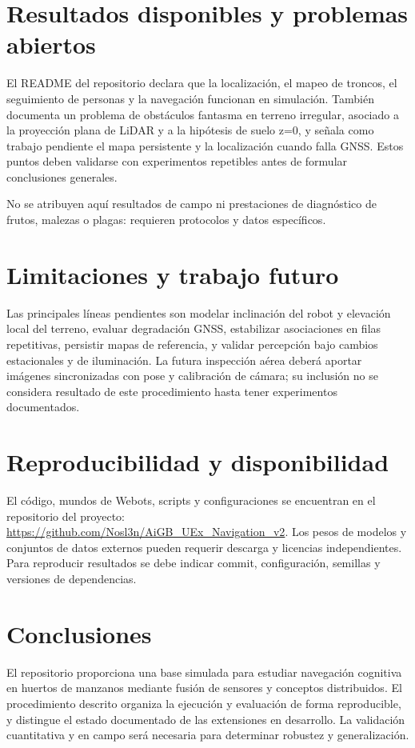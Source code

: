 \documentclass[12pt,a4paper]{article}
\begin{document}
\section{Resultados disponibles y problemas abiertos}
El README del repositorio declara que la localización, el mapeo de troncos, el seguimiento de personas y la navegación funcionan en simulación. También documenta un problema de obstáculos fantasma en terreno irregular, asociado a la proyección plana de LiDAR y a la hipótesis de suelo z=0, y señala como trabajo pendiente el mapa persistente y la localización cuando falla GNSS. Estos puntos deben validarse con experimentos repetibles antes de formular conclusiones generales.

No se atribuyen aquí resultados de campo ni prestaciones de diagnóstico de frutos, malezas o plagas: requieren protocolos y datos específicos.
\section{Limitaciones y trabajo futuro}
Las principales líneas pendientes son modelar inclinación del robot y elevación local del terreno, evaluar degradación GNSS, estabilizar asociaciones en filas repetitivas, persistir mapas de referencia, y validar percepción bajo cambios estacionales y de iluminación. La futura inspección aérea deberá aportar imágenes sincronizadas con pose y calibración de cámara; su inclusión no se considera resultado de este procedimiento hasta tener experimentos documentados.
\section{Reproducibilidad y disponibilidad}
El código, mundos de Webots, scripts y configuraciones se encuentran en el repositorio del proyecto: \url{https://github.com/Nosl3n/AiGB_UEx_Navigation_v2}. Los pesos de modelos y conjuntos de datos externos pueden requerir descarga y licencias independientes. Para reproducir resultados se debe indicar commit, configuración, semillas y versiones de dependencias.
\section{Conclusiones}
El repositorio proporciona una base simulada para estudiar navegación cognitiva en huertos de manzanos mediante fusión de sensores y conceptos distribuidos. El procedimiento descrito organiza la ejecución y evaluación de forma reproducible, y distingue el estado documentado de las extensiones en desarrollo. La validación cuantitativa y en campo será necesaria para determinar robustez y generalización.
\end{document}
